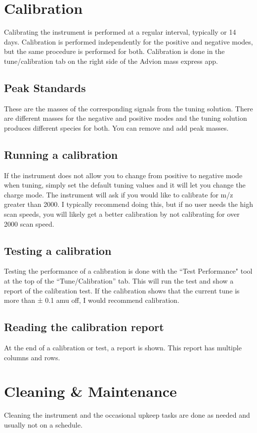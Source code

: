 \documentclass[12pt, letterpaper]{article}
\begin{document}
\section{Calibration}
Calibrating the instrument is performed at a regular interval, typically  or 14 days.
Calibration is performed independently for the positive and negative modes, but the same procedure is performed for both.
Calibration is done in the tune/calibration tab on the right side of the Advion mass express app.

\subsection{Peak Standards}
These are the masses of the corresponding signals from the tuning solution.
There are different masses for the negative and positive modes and the tuning solution produces different species for both. You can remove and add peak masses.

\subsection{Running a calibration}
If the instrument does not allow you to change from positive to negative mode when tuning, simply set the default tuning values and it will let you change the charge mode.
The instrument will ask if you would like to calibrate for m/z greater than 2000.
I typically recommend doing this, but if no user needs the high scan speeds, you will likely get a better calibration by not calibrating for over 2000 scan speed.

\subsection{Testing a calibration}
Testing the performance of a calibration is done with the ``Test Performance" tool at the top of the ``Tune/Calibration'' tab.
This will run the test and show a report of the calibration test.
If the calibration shows that the current tune is more than  ± 0.1 amu off, I would recommend calibration.


\subsection{Reading the calibration report}
At the end of a calibration or test, a report is shown.
This report has multiple columns and rows.

\section{Cleaning \& Maintenance}
Cleaning the instrument and the occasional upkeep tasks are done as needed and usually not on a schedule.
\end{document}
